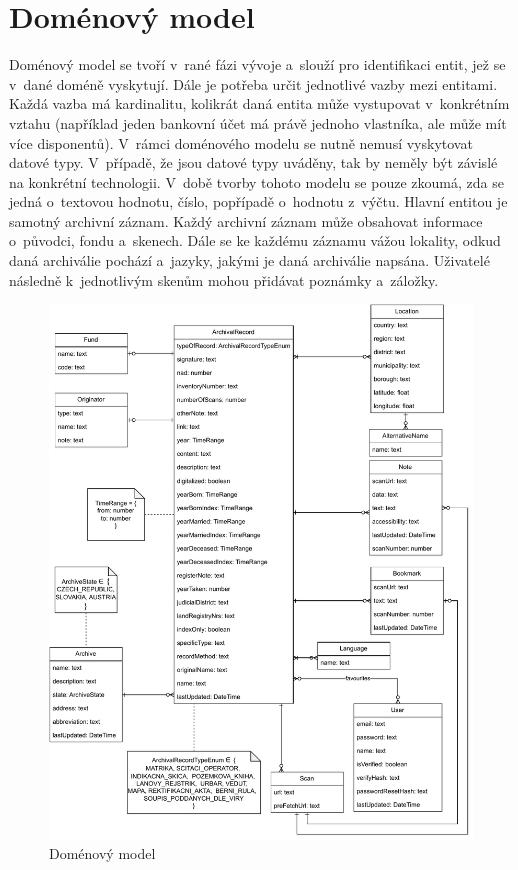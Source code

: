 \newpage
\section{Doménový model}
Doménový model \cite{domainModel} se tvoří v~rané fázi vývoje a~slouží pro identifikaci entit, jež se v~dané doméně vyskytují. Dále je potřeba určit jednotlivé vazby mezi entitami. Každá vazba má kardinalitu, kolikrát daná entita může vystupovat v~konkrétním vztahu (například jeden bankovní účet má právě jednoho vlastníka, ale může mít více disponentů). V~rámci doménového modelu se nutně nemusí vyskytovat datové typy. V~případě, že jsou datové typy uváděny, tak by neměly být závislé na konkrétní technologii. V~době tvorby tohoto modelu se pouze zkoumá, zda se jedná o~textovou hodnotu, číslo, popřípadě o~hodnotu z~výčtu. Hlavní entitou je samotný archivní záznam. Každý archivní záznam může obsahovat informace o~původci, fondu a~skenech. Dále se ke každému záznamu vážou lokality, odkud daná archiválie pochází a~jazyky, jakými je daná archiválie napsána. Uživatelé následně k~jednotlivým skenům mohou přidávat poznámky a~záložky. 

\begin{figure}[htbp]
    \centering
        \includegraphics[scale=.75]{obrazky-figures/specification/domain_model.pdf}
        \caption{Doménový model}
\end{figure}

